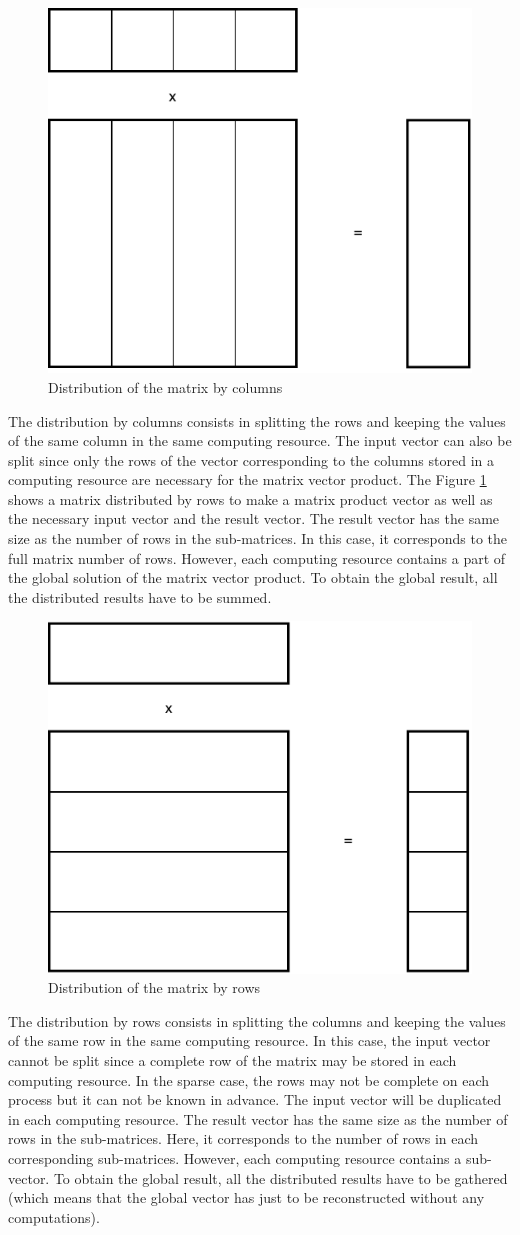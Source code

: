 \begin{figure}[h]
	\centering
	\includegraphics[width=.5\textwidth]{pmv_c}
	\caption{Distribution of the matrix by columns \label{fig:sparse:pmv_c}}
\end{figure}

The distribution by columns consists in splitting the rows and keeping the values of the same column in the same computing resource.
The input vector can also be split since only the rows of the vector corresponding to the columns stored in a computing resource are necessary for the matrix vector product.
The Figure \ref{fig:sparse:pmv_c} shows a matrix distributed by rows to make a matrix product vector as well as the necessary input vector and the result vector.
The result vector has the same size as the number of rows in the sub-matrices.
In this case, it corresponds to the full matrix number of rows.
However, each computing resource contains a part of the global solution of the matrix vector product.
To obtain the global result, all the distributed results have to be summed.


\begin{figure}[h]
	\centering
	\includegraphics[width=.5\textwidth]{pmv_r}
	\caption{Distribution of the matrix by rows\label{fig:sparse:pmv_r}}
\end{figure}

The distribution by rows consists in splitting the columns and keeping the values of the same row in the same computing resource.
In this case, the input vector cannot be split since a complete row of the matrix may be stored in each computing resource.
In the sparse case, the rows may not be complete on each process but it can not be known in advance.
The input vector will be duplicated in each computing resource.
The result vector has the same size as the number of rows in the sub-matrices.
Here, it corresponds to the number of rows in each corresponding sub-matrices.
However, each computing resource contains a sub-vector.
To obtain the global result, all the distributed results have to be gathered (which means that the global vector has just to be reconstructed without any computations).


